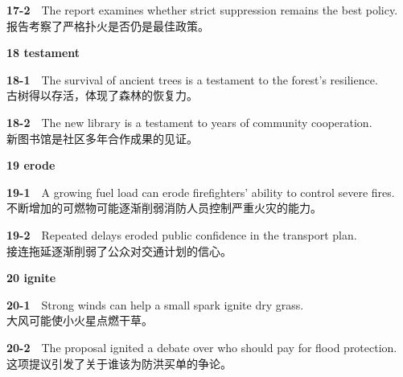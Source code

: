 \documentclass[a4paper,11pt,openany]{report}
\newcommand{\zhline}[1]{{\CJKsf\color{bodygrey}#1}}
\begin{document}
\begin{samepage}
\textbf{17-2}　The report examines whether strict suppression remains the best policy.\\
\zhline{报告考察了严格扑火是否仍是最佳政策。}
\par\end{samepage}

\textbf{18 testament}

\begin{samepage}
\textbf{18-1}　The survival of ancient trees is a testament to the forest's resilience.\\
\zhline{古树得以存活，体现了森林的恢复力。}
\par\end{samepage}

\begin{samepage}
\textbf{18-2}　The new library is a testament to years of community cooperation.\\
\zhline{新图书馆是社区多年合作成果的见证。}
\par\end{samepage}

\textbf{19 erode}

\begin{samepage}
\textbf{19-1}　A growing fuel load can erode firefighters' ability to control severe fires.\\
\zhline{不断增加的可燃物可能逐渐削弱消防人员控制严重火灾的能力。}
\par\end{samepage}

\begin{samepage}
\textbf{19-2}　Repeated delays eroded public confidence in the transport plan.\\
\zhline{接连拖延逐渐削弱了公众对交通计划的信心。}
\par\end{samepage}

\textbf{20 ignite}

\begin{samepage}
\textbf{20-1}　Strong winds can help a small spark ignite dry grass.\\
\zhline{大风可能使小火星点燃干草。}
\par\end{samepage}

\begin{samepage}
\textbf{20-2}　The proposal ignited a debate over who should pay for flood protection.\\
\zhline{这项提议引发了关于谁该为防洪买单的争论。}
\par\end{samepage}
\end{document}
